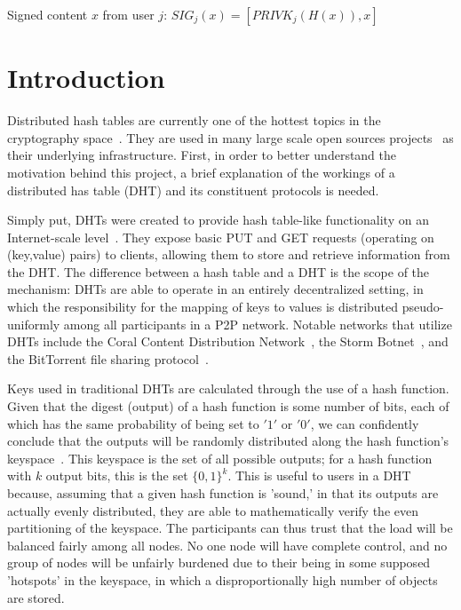 \documentclass[12pt]{article}
\begin{document}
Signed content $x$ from user $j$: $SIG_j(x) = \left[ PRIVK_j( H(x) ), x \right]$

\section{Introduction}
\par Distributed hash tables are currently one of the hottest topics in the cryptography space~\cite{Stoica:2001dj,Rowstron:2001ea,Ratnasamy:2001wn}. They are used in many large scale open sources projects~\cite{Freitas:2013tb,Xu:2010vs,Perfitt:2010fh} as their underlying infrastructure. First, in order to better understand the motivation behind this project, a brief explanation of the workings of a distributed has table (DHT) and its constituent protocols is needed.

\par Simply put, DHTs were created to provide hash table-like functionality on an Internet-scale level~\cite{Ratnasamy:2001wn}. They expose basic PUT and GET requests (operating on (key,value) pairs) to clients, allowing them to store and retrieve information from the DHT. The difference between a hash table and a DHT is the scope of the mechanism: DHTs are able to operate in an entirely decentralized setting, in which the responsibility for the mapping of keys to values is distributed pseudo-uniformly among all participants in a P2P network. Notable networks that utilize DHTs include the Coral Content Distribution Network~\cite{Freedman:2004vb}, the Storm Botnet~\cite{Holz:2008uk}, and the BitTorrent file sharing protocol~\cite{Cohen:y1_8mBnw}.

\par Keys used in traditional DHTs are calculated through the use of a hash function. Given that the digest (output) of a hash function is some number of bits, each of which has the same probability of being set to $'1'$ or $'0'$, we can confidently conclude that the outputs will be randomly distributed along the hash function's keyspace~. This keyspace is the set of all possible outputs; for a hash function with $k$ output bits, this is the set $\{0,1\}^k$. This is useful to users in a DHT because, assuming that a given hash function is 'sound,' in that its outputs are actually evenly distributed, they are able to mathematically verify the even partitioning of the keyspace. The participants can thus trust that the load will be balanced fairly among all nodes. No one node will have complete control, and no group of nodes will be unfairly burdened due to their being in some supposed 'hotspots' in the keyspace, in which a disproportionally high number of objects are stored.~
\end{document}
